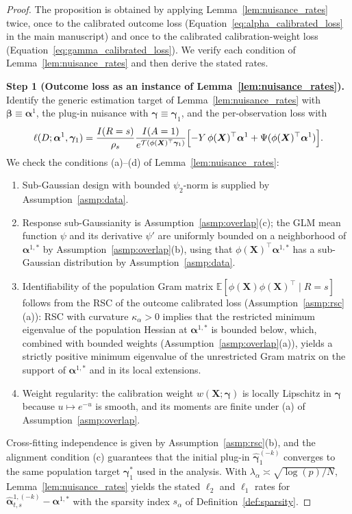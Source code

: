 \documentclass{article}
\begin{document}
\begin{proof}
The proposition is obtained by applying Lemma~\ref{lem:nuisance_rates} twice, once to the calibrated outcome loss (Equation~\eqref{eq:alpha_calibrated_loss} in the main manuscript) and once to the calibrated calibration-weight loss (Equation~\eqref{eq:gamma_calibrated_loss}). We verify each condition of Lemma~\ref{lem:nuisance_rates} and then derive the stated rates.

\textbf{Step 1 (Outcome loss as an instance of Lemma~\ref{lem:nuisance_rates}).}
Identify the generic estimation target of Lemma~\ref{lem:nuisance_rates} with $\boldsymbol{\beta}\equiv\boldsymbol{\alpha}^1$, the plug-in nuisance with $\boldsymbol{\gamma}\equiv\boldsymbol{\gamma}_1$, and the per-observation loss with
\[
\ell(D;\boldsymbol{\alpha}^1,\boldsymbol{\gamma}_1)=\frac{I(R=s)}{\rho_s}\frac{I(A=1)}{e^{\mathcal{T}(\phi(\boldsymbol{X})^\top\boldsymbol{\gamma}_1)}}\Bigl[-Y\,\phi(\boldsymbol{X})^\top\boldsymbol{\alpha}^1+\Psi(\phi(\boldsymbol{X})^\top\boldsymbol{\alpha}^1)\Bigr].
\]
We check the conditions (a)--(d) of Lemma~\ref{lem:nuisance_rates}:
\begin{enumerate}[label={(\alph*)},leftmargin=*]
\item Sub-Gaussian design with bounded $\psi_2$-norm is supplied by Assumption~\ref{asmp:data}.
\item Response sub-Gaussianity is Assumption~\ref{asmp:overlap}(c); the GLM mean function $\psi$ and its derivative $\psi'$ are uniformly bounded on a neighborhood of $\boldsymbol{\alpha}^{1,*}$ by Assumption~\ref{asmp:overlap}(b), using that $\phi(\boldsymbol{X})^\top\boldsymbol{\alpha}^{1,*}$ has a sub-Gaussian distribution by Assumption~\ref{asmp:data}.
\item Identifiability of the population Gram matrix $\mathbb{E}[\phi(\boldsymbol{X})\phi(\boldsymbol{X})^\top\mid R=s]$ follows from the RSC of the outcome calibrated loss (Assumption~\ref{asmp:rsc}(a)): RSC with curvature $\kappa_\alpha>0$ implies that the restricted minimum eigenvalue of the population Hessian at $\boldsymbol{\alpha}^{1,*}$ is bounded below, which, combined with bounded weights (Assumption~\ref{asmp:overlap}(a)), yields a strictly positive minimum eigenvalue of the unrestricted Gram matrix on the support of $\boldsymbol{\alpha}^{1,*}$ and in its local extensions.
\item Weight regularity: the calibration weight $w(\boldsymbol{X};\boldsymbol{\gamma})$ is locally Lipschitz in $\boldsymbol{\gamma}$ because $u\mapsto e^{-u}$ is smooth, and its moments are finite under (a) of Assumption~\ref{asmp:overlap}.
\end{enumerate}
Cross-fitting independence is given by Assumption~\ref{asmp:rsc}(b), and the alignment condition (c) guarantees that the initial plug-in $\widehat{\boldsymbol{\gamma}}_1^{(-k)}$ converges to the same population target $\boldsymbol{\gamma}_1^*$ used in the analysis.
With $\lambda_\alpha\asymp\sqrt{\log(p)/N}$, Lemma~\ref{lem:nuisance_rates} yields the stated $\ell_2$ and $\ell_1$ rates for $\widehat{\boldsymbol{\alpha}}_{t,s}^{1,(-k)}-\boldsymbol{\alpha}^{1,*}$ with the sparsity index $s_\alpha$ of Definition~\ref{def:sparsity}.


\end{proof}
\end{document}
